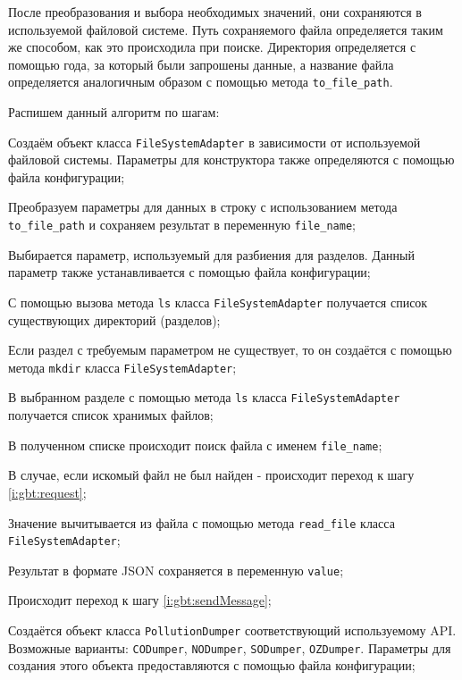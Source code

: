 После преобразования и выбора необходимых значений, они сохраняются в используемой файловой системе.
Путь сохраняемого файла определяется таким же способом, как это происходила при поиске.
Директория определяется с помощью года, за который были запрошены данные, а название файла определяется аналогичным образом с помощью метода \texttt{to\_file\_path}.

Распишем данный алгоритм по шагам:
\begin{enumerate_step}
    \item Создаём объект класса \texttt{FileSystemAdapter} в зависимости от используемой файловой системы.
     Параметры для конструктора также определяются с помощью файла конфигурации;
    \item Преобразуем параметры для данных в строку с использованием метода \texttt{to\_file\_path} и сохраняем результат в переменную \texttt{file\_name};
    \item Выбирается параметр, используемый для разбиения для разделов. 
    Данный параметр также устанавливается с помощью файла конфигурации;
    \item С помощью вызова метода \texttt{ls} класса \texttt{FileSystemAdapter} получается список существующих директорий (разделов);
    \item Если раздел с требуемым параметром не существует, то он создаётся с помощью метода \texttt{mkdir} класса \texttt{FileSystemAdapter};
    \item В выбранном разделе с помощью метода \texttt{ls} класса \texttt{FileSystemAdapter} получается список хранимых файлов;
    \item В полученном списке происходит поиск файла с именем \texttt{file\_name};
    \item В случае, если искомый файл не был найден - происходит переход к шагу \ref{i:gbt:request};
    \item Значение вычитывается из файла с помощью метода \texttt{read\_file} класса \texttt{FileSystemAdapter};
    \item Результат в формате JSON сохраняется в переменную \texttt{value};
    \item Происходит переход к шагу \ref{i:gbt:sendMessage};
    \item \label{i:gbt:request} Создаётся объект класса \texttt{PollutionDumper} соответствующий используемому API. 
    Возможные варианты: \texttt{CODumper}, \texttt{NODumper}, \texttt{SODumper}, \texttt{OZDumper}.
    Параметры для создания этого объекта предоставляются с помощью файла конфигурации;

\end{enumerate_step}

